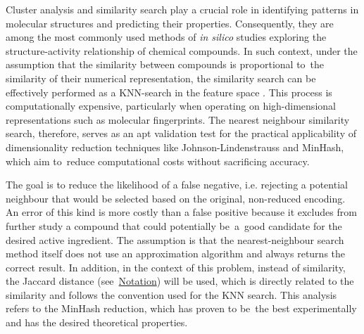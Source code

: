 Cluster analysis and similarity search play a crucial role in identifying patterns in molecular structures and predicting their properties. Consequently, they are among the most commonly used methods of \emph{in silico} studies exploring the structure-activity relationship of chemical compounds. In such context, under the assumption that the similarity between compounds is proportional to~the similarity of their numerical representation, the similarity search can be effectively performed as a KNN-search in the feature space \cite{weber1998knn}. This process is computationally expensive, particularly when operating on high-dimensional representations such as molecular fingerprints. The nearest neighbour similarity search, therefore, serves as an apt validation test for the practical applicability of dimensionality reduction techniques like Johnson-Lindenstrauss and MinHash, which aim to~reduce computational costs without sacrificing accuracy.

The goal is to reduce the likelihood of a false negative, i.e. rejecting a potential neighbour that would be selected based on the original, non-reduced encoding. An error of this kind is more costly than a false positive because it excludes from further study a compound that could potentially be~a~good candidate for the desired active ingredient. The assumption is that the nearest-neighbour search method itself does not use an approximation algorithm and always returns the correct result. In addition, in the context of this problem, instead of similarity, the Jaccard distance (see~\hyperref[ch:notation]{Notation}) will be used, which is directly related to the similarity and follows the convention used for the KNN search. This analysis refers to the MinHash reduction, which has proven to be~the best experimentally and has the desired theoretical properties.


